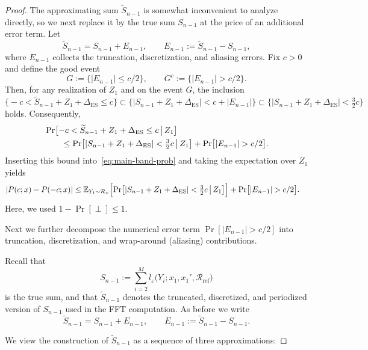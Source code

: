 \documentclass{article}
\theoremstyle{plain}
\theoremstyle{definition}
\begin{document}
\begin{proof}
The approximating sum $\widetilde S_{n-1}$ is somewhat inconvenient to
analyze directly, so we next replace it by the true sum $S_{n-1}$ at the
price of an additional error term.
Let
\[
  \widetilde S_{n-1}
  = S_{n-1} + E_{n-1},
  \qquad
  E_{n-1} := \widetilde S_{n-1} - S_{n-1},
\]
where $E_{n-1}$ collects the truncation, discretization, and aliasing
errors.
Fix $c>0$ and define the good event
\[
  G := \bigl\{|E_{n-1}| \le c/2\bigr\},
  \qquad
  G^c := \bigl\{|E_{n-1}| > c/2\bigr\}.
\]
Then, for any realization of $Z_1$ and on the event $G$, the inclusion
\[
  \bigl\{
    -c < \widetilde S_{n-1} + Z_1 + \Delta_{\mathrm{ES}} \le c
  \bigr\}
  \subset
  \bigl\{
    |S_{n-1} + Z_1 + \Delta_{\mathrm{ES}}|
    < c + |E_{n-1}|
  \bigr\}
  \subset
  \bigl\{
    |S_{n-1} + Z_1 + \Delta_{\mathrm{ES}}|
    < \tfrac{3}{2}c
  \bigr\}
\]
holds.
Consequently,
\begin{align}
  &\Pr\bigl[
    -c < \widetilde S_{n-1} + Z_1 + \Delta_{\mathrm{ES}} \le c
    \,\big|\,
    Z_1
  \bigr]
  \notag\\
  &\qquad\le
  \Pr\bigl[
    |S_{n-1} + Z_1 + \Delta_{\mathrm{ES}}|
    < \tfrac{3}{2}c
    \,\big|\,
    Z_1
  \bigr]
  +
  \Pr\bigl[|E_{n-1}|>c/2\bigr].
  \label{eq:band-replace-S}
\end{align}
Inserting this bound into~\eqref{eq:main-band-prob} and taking the
expectation over $Z_1$ yields
\begin{align}
  |P(c;x) - P(-c;x)|
  &\le
  \mathbb E_{Y_1\sim\mathcal R_x}\Bigl[
    \Pr\bigl[
      |S_{n-1} + Z_1 + \Delta_{\mathrm{ES}}|
      < \tfrac{3}{2}c
      \,\big|\,
      Z_1
    \bigr]
  \Bigr]
  +
  \Pr\bigl[|E_{n-1}|>c/2\bigr].
  \label{eq:main-term-S-plus-error}
\end{align}
Here, we used $1-\Pr[\perp] \le 1$.

Next we further decompose the numerical error term
\(\Pr[|E_{n-1}|>c/2]\) into truncation, discretization, and wrap-around
(aliasing) contributions.

Recall that
\[
  S_{n-1}
  :=
  \sum_{i=2}^M l_\varepsilon\bigl(Y_i;x_1,x_1',\mathcal R_{\mathrm{ref}}\bigr)
\]
is the true sum, and that \(\widetilde S_{n-1}\) denotes the truncated,
discretized, and periodized version of \(S_{n-1}\) used in the FFT
computation. As before we write
\[
  \widetilde S_{n-1}
  = S_{n-1} + E_{n-1},
  \qquad
  E_{n-1} := \widetilde S_{n-1} - S_{n-1}.
\]

We view the construction of \(\widetilde S_{n-1}\) as a sequence of three
approximations:


\end{proof}
\end{document}
